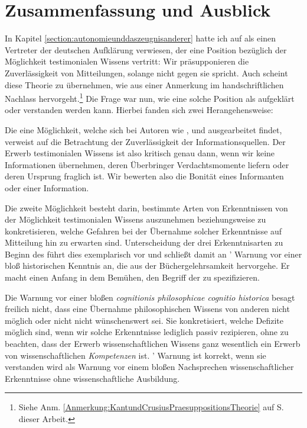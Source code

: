 \section{Zusammenfassung und Ausblick}
In Kapitel \ref{section:autonomieunddaszeugnisanderer} hatte ich auf
als einen Vertreter der deutschen Aufklärung verwiesen, der eine
 Position bezüglich der Möglichkeit testimonialen
Wissens vertritt: Wir präsupponieren die Zuverlässigkeit von Mitteilungen,
solange nicht gegen sie spricht. Auch  scheint diese
Theorie zu übernehmen, wie aus einer Anmerkung im handschriftlichen Nachlass
hervorgeht.\footnote{Siehe Anm.
\ref{Anmerkung:KantundCrusiusPraesuppositionsTheorie} auf S.
\pageref{Anmerkung:KantundCrusiusPraesuppositionsTheorie} dieser Arbeit.} Die
Frage war nun, wie eine solche Position als aufgeklärt oder  verstanden
werden kann. Hierbei fanden sich zwei Herangehensweise:
\begin{nummerierung}
\item Die eine Möglichkeit, welche sich bei Autoren wie
,
 und
ausgearbeitet findet, verweist auf die Betrachtung der Zuverlässigkeit der
Informationsquellen. Der Erwerb testimonialen Wissens ist also kritisch genau
dann, wenn wir keine Informationen übernehmen, deren Überbringer
Verdachtsmomente liefern oder deren Ursprung fraglich ist. Wir bewerten also die
Bonität eines Informanten oder einer Information.
\item Die zweite Möglichkeit besteht darin, bestimmte Arten von Erkenntnissen
von der Möglichkeit testimonialen Wissens auszunehmen beziehungsweise zu
konkretisieren, welche Gefahren bei der Übernahme solcher Erkenntnisse auf
Mitteilung hin zu erwarten sind.
Unterscheidung der drei Erkenntnisarten zu Beginn des  führt dies exemplarisch vor und schließt
damit an ' Warnung vor einer bloß
historischen Kenntnis an, die aus der Büchergelehrsamkeit hervorgehe. Er macht
einen Anfang in dem Bemühen, den Begriff der 
zu spezifizieren.
\end{nummerierung}
Die Warnung vor einer bloßen \emph{cognitionis philosophicae cognitio historica}
besagt freilich nicht, dass eine Übernahme philosophischen Wissens von anderen
nicht möglich oder nicht nicht wünschenswert sei. Sie konkretisiert, welche
Defizite möglich sind, wenn wir solche Erkenntnisse lediglich passiv rezipieren,
ohne zu beachten, dass der Erwerb wissenschaftlichen Wissens ganz wesentlich ein
Erwerb von wissenschaftlichen \emph{Kompetenzen} ist.
' Warnung ist korrekt, wenn sie
verstanden wird als Warnung vor einem bloßen Nachsprechen wissenschaftlicher
Erkenntnisse ohne wissenschaftliche Ausbildung.

